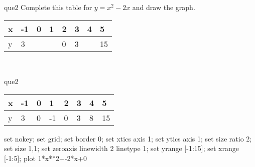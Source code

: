 \documentclass[13.5pt, varwidth=true]{beamer}
\begin{document}
\begin{frame}[shrink=19,fragile]
	\begin{beamercolorbox}[rounded=true, left, shadow=true,wd=14.8cm]{que2}
		 Complete this table for $y = x^{2} - 2x$ and draw the graph. \\[0.3cm] \renewcommand{\arraystretch}{1.2}\begin{tabular}{|C|C|C|C|C|C|C|C|} \hline x & -1 & 0 & 1 & 2 & 3 & 4 & 5 \\ \hline y & 3 &  &  & 0 & 3 &  & 15\\ \hline \end{tabular}\\[0.3cm]
	\end{beamercolorbox}
\end{frame}
\begin{frame}[shrink=19,fragile]
	\begin{beamercolorbox}[rounded=true, left, shadow=true,wd=14.8cm]{que2}
		\renewcommand{\arraystretch}{1.2}\begin{tabular}{|C|C|C|C|C|C|C|C|} \hline x & -1 & 0 & 1 & 2 & 3 & 4 & 5 \\ \hline y & 3 & 0 & -1 & 0 & 3 & 8 & 15\\ \hline \end{tabular}\begin{gnuplot}[terminal=pdf] set nokey; set grid; set border 0; set xtics axis 1; set ytics axis 1; set size ratio 2; set size 1,1; set zeroaxis linewidth 2 linetype 1; set yrange [-1:15]; set xrange [-1:5]; plot 1*x**2+-2*x+0 \end{gnuplot}
	\end{beamercolorbox}
\end{frame}
\end{document}
